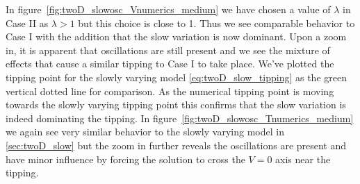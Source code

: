 In figure~\ref{fig:twoD_slowosc_Vnumerics_medium} we have chosen a value of $\lambda$ in Case II as $\lambda>1$ but this choice is close to 1. Thus we see comparable behavior to Case I with the addition that the slow variation is now dominant. Upon a zoom in, it is apparent that oscillations are still present and we see the mixture of effects that cause a similar tipping to Case I to take place. We've plotted the tipping point for the slowly varying model \eqref{eq:twoD_slow_tipping} as the green vertical dotted line for comparison. As the numerical tipping point is moving towards the slowly varying tipping point this confirms that the slow variation is indeed dominating the tipping. In figure~\ref{fig:twoD_slowosc_Tnumerics_medium} we again see very similar behavior to the slowly varying model in \autoref{sec:twoD_slow} but the zoom in further reveals the oscillations are present and have minor influence by forcing the solution to cross the $V=0$ axis near the tipping.

